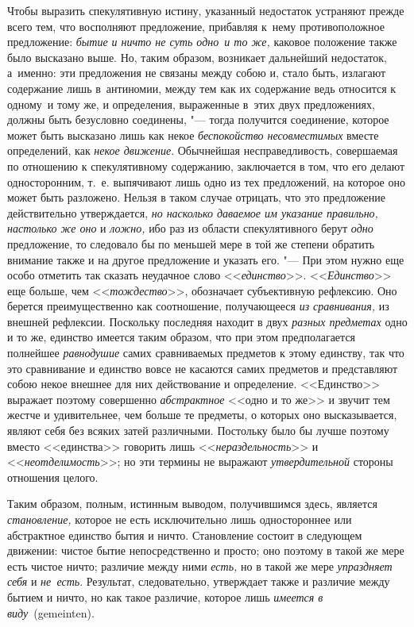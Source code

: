 Чтобы выразить спекулятивную истину, указанный недостаток устраняют прежде
всего тем, что восполняют предложение, прибавляя к~нему противоположное
предложение: {\em бытие и ничто не суть одно~и то же,} каковое положение также
было высказано выше. Но, таким образом, возникает дальнейший
недостаток, а~именно: эти предложения не связаны между собою и, стало быть,
излагают содержание лишь в~антиномии, между тем как их содержание ведь
относится к одному~и тому же, и определения, выраженные в~этих двух
предложениях, должны быть безусловно соединены, "--- тогда получится
соединение, которое может быть высказано лишь как некое {\em беспокойство
несовместимых} вместе определений, как {\em некое движение}. Обычнейшая
несправедливость, совершаемая по отношению к спекулятивному содержанию,
заключается в том, что его делают односторонним, т.~е. выпячивают лишь одно из
тех предложений, на которое оно может быть разложено. Нельзя в таком случае
отрицать, что это предложение действительно утверждается, {\em но насколько
даваемое им указание правильно, настолько же оно} и {\em ложно,} ибо раз
из области спекулятивного берут {\em одно} предложение, то следовало бы по
меньшей мере в той же степени обратить внимание также и на другое предложение и
указать его. "--- При этом нужно еще особо отметить так сказать неудачное слово
<<{\em единство}>>. <<{\em Единство}>> еще больше, чем <<{\em тождество}>>,
обозначает субъективную рефлексию. Оно берется преимущественно как соотношение,
получающееся {\em из сравнивания,} из внешней рефлексии. Поскольку последняя
находит в двух {\em разных предметах} одно и то же, единство имеется таким
образом, что при этом предполагается полнейшее {\em равнодушие} самих
сравниваемых предметов к этому единству, так что это сравнивание и единство
вовсе не касаются самих предметов и представляют собою некое внешнее для них
действование и определение. <<Единство>> выражает поэтому совершенно
{\em абстрактное} <<одно и то же>> и звучит тем жестче и удивительнее, чем
больше те предметы, о которых оно высказывается, являют себя без всяких затей
различными. Постольку было бы лучше поэтому вместо <<единства>> говорить лишь
<<{\em нераздельность}>> и <<{\em неотделимость}>>; но эти термины не выражают
{\em утвердительной} стороны отношения целого.

Таким образом, полным, истинным выводом, получившимся здесь, является
{\em становление,} которое не есть исключительно лишь одностороннее или
абстрактное единство бытия и ничто. Становление состоит в следующем движении:
чистое бытие непосредственно и просто; оно поэтому в такой же мере есть чистое
ничто; различие между ними {\em есть,} но в такой же мере {\em упраздняет себя}
и {\em не~есть}. Результат, следовательно, утверждает также и различие между
бытием и ничто, но как такое различие, которое лишь
{\em имеется в виду}~(gemeinten).

